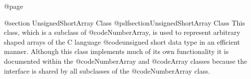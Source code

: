 @page

@section  UnsignedShortArray Class
@pdfsection{UnsignedShortArray Class}
This class, which is a subclass of @code{NumberArray}, is used to
represent arbitrary shaped arrays of the C language @code{unsigned
short} data type in an efficient manner.  Although this class implements
much of its own functionality it is documented within the
@code{NumberArray} and @code{Array} classes because the interface is
shared by all subclasses of the @code{NumberArray} class.









